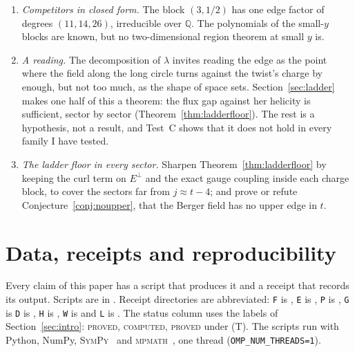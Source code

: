 \documentclass[11pt]{article}
\theoremstyle{definition}
\theoremstyle{remark}
\newcommand{\PROVED}{\textsc{proved}}
\newcommand{\COMPUTED}{\textsc{computed}}
\newcommand{\PROVEDT}{\textsc{proved} under (T)}
\begin{document}
\begin{enumerate}
  the principal circle. Why she returns at the far wall of $Sp(2)$ is open. Three readings (the short highest root's
  own circle, a corner ray of the chamber, or the short root tied at the top) predict different outcomes on three
  circles of $Sp(3)$; a further pre-registered test (Test~G) separates them and replicates Test~F in $G_2$ and $Sp(3)$.
  It is running.
  \item \emph{Competitors in closed form.} The block $(3,1/2)$ has one edge factor of degrees $(11,14,26)$, irreducible
  over $\mathbb{Q}$. The polynomials of the small-$y$ blocks are known, but no two-dimensional region theorem at small $y$ is.
  \item \emph{A reading.} The decomposition of $\lambda$ invites reading the edge as the point where the field along the
  long circle turns against the twist's charge by enough, but not too much, as the shape of space sets. Section~\ref{sec:ladder}
  makes one half of this a theorem: the flux gap against her helicity is sufficient, sector by sector
  (Theorem~\ref{thm:ladderfloor}). The rest is a hypothesis, not a result, and Test~C shows that it does not hold in every
  family I have tested.
  \item \emph{The ladder floor in every sector.} Sharpen Theorem~\ref{thm:ladderfloor} by keeping the curl term on
  $E^\perp$ and the exact gauge coupling inside each charge block, to cover the sectors far from $j\approx t-4$; and
  prove or refute Conjecture~\ref{conj:noupper}, that the Berger field has no upper edge in $t$.
\end{enumerate}

\section{Data, receipts and reproducibility}\label{sec:data}

Every claim of this paper has a script that produces it and a receipt that records its output. Scripts are in
. Receipt directories are abbreviated: \texttt{F} is ,
\texttt{E} is , \texttt{P} is ,
\texttt{G} is  \texttt{D} is , \texttt{H} is , \texttt{W} is  and \texttt{L} is . The
status column uses the labels of Section~\ref{sec:intro}: \PROVED, \COMPUTED, \PROVEDT. The scripts run with Python,
NumPy, \textsc{SymPy}~\cite{sympy2017} and \textsc{mpmath}~\cite{mpmath}, one thread
(\texttt{OMP\_NUM\_THREADS=1}).
\end{document}
